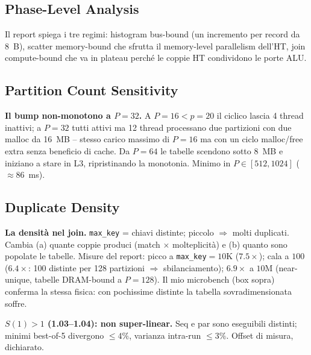 \documentclass[11pt,a4paper]{article}
\begin{document}
\subsection{Phase-Level Analysis}

Il report spiega i tre regimi: histogram bus-bound (un incremento per record da 8~B), scatter memory-bound che sfrutta il memory-level parallelism dell'HT, join compute-bound che va in plateau perché le coppie HT condividono le porte ALU.

\subsection{Partition Count Sensitivity}

\begin{deriv}
\textbf{Il bump non-monotono a $P=32$.} A $P{=}16<p{=}20$ il ciclico lascia 4 thread inattivi; a $P{=}32$ tutti attivi ma 12 thread processano due partizioni con due malloc da 16~MB -- stesso carico massimo di $P{=}16$ ma con un ciclo malloc/free extra senza beneficio di cache. Da $P{=}64$ le tabelle scendono sotto 8~MB e iniziano a stare in L3, ripristinando la monotonia. Minimo in $P\in[512,1024]$ ($\approx86$~ms).
\end{deriv}

\subsection{Duplicate Density}

\begin{deriv}
\textbf{La densità nel join.} \texttt{max\_key} = chiavi distinte; piccolo $\Rightarrow$ molti duplicati. Cambia (a) quante coppie produci (match $\times$ molteplicità) e (b) quanto sono popolate le tabelle. Misure del report: picco a \texttt{max\_key}$=10$K ($7.5\times$); cala a $100$ ($6.4\times$: 100 distinte per 128 partizioni $\Rightarrow$ sbilanciamento); $6.9\times$ a $10$M (near-unique, tabelle DRAM-bound a $P{=}128$). Il mio microbench (box sopra) conferma la stessa fisica: con pochissime distinte la tabella sovradimensionata soffre.
\end{deriv}

\begin{difesa}
\textbf{$S(1)>1$ (1.03--1.04): non super-linear.} Seq e par sono eseguibili distinti; minimi best-of-5 divergono $\le4\%$, varianza intra-run $\le3\%$. Offset di misura, dichiarato.
\end{difesa}

\end{document}
